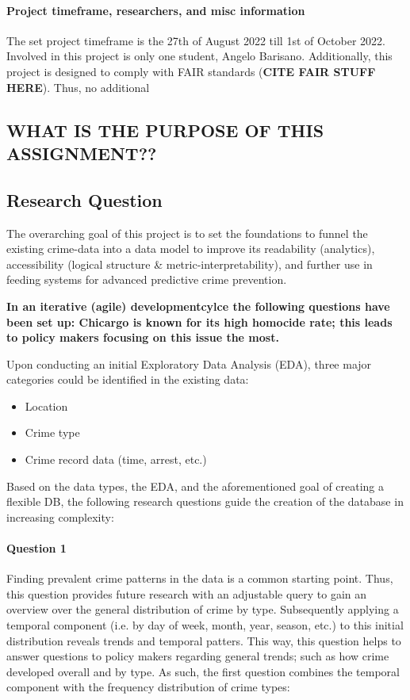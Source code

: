 \documentclass[a4paper]{article}
\begin{document}
\paragraph{Project timeframe, researchers, and misc information} The set project timeframe is the 27th of August 2022 till 1st of October 2022. Involved in this project is only one student, Angelo Barisano. Additionally, this project is designed to comply with FAIR standards (\textbf{CITE FAIR STUFF HERE}). Thus, no additional 

\subsection{WHAT IS THE PURPOSE OF THIS ASSIGNMENT??}

\subsection{Research Question}
The overarching goal of this project is to set the foundations to funnel the existing crime-data into a data model to improve its readability (analytics), accessibility (logical structure \& metric-interpretability), and further use in feeding systems for advanced predictive crime prevention. 


\textbf{In an iterative (agile) developmentcylce the following questions have been set up: Chicargo is known for its high homocide rate; this leads to policy makers focusing on this issue the most. }

Upon conducting an initial Exploratory Data Analysis (EDA), three major categories could be identified in the existing data: 

\begin{itemize}
  \item Location
  \item Crime type
  \item Crime record data (time, arrest, etc.)
\end{itemize}

Based on the data types, the EDA, and the aforementioned goal of creating a flexible DB, the following research questions guide the creation of the database in increasing complexity:

\paragraph{Question 1} Finding prevalent crime patterns in the data is a common starting point. Thus, this question provides future research with an adjustable query to gain an overview over the general distribution of crime by type. Subsequently applying a temporal component (i.e. by day of week,  month, year, season, etc.) to this initial distribution reveals trends and temporal patters. This way, this question helps to answer questions to policy makers regarding general trends; such as how crime developed overall and by type. As such, the first question combines the temporal component with the frequency distribution of crime types:
\end{document}
